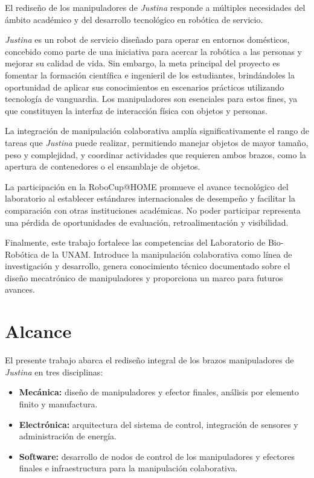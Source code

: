 El rediseño de los manipuladores de \emph{Justina} responde a múltiples necesidades del ámbito académico y del desarrollo tecnológico en robótica de servicio.

\emph{Justina} es un robot de servicio diseñado para operar en entornos domésticos, concebido como parte de una iniciativa para acercar la robótica a las personas y mejorar su calidad de vida. Sin embargo, la meta principal del proyecto es fomentar la formación científica e ingenieril de los estudiantes, brindándoles la oportunidad de aplicar sus conocimientos en escenarios prácticos utilizando tecnología de vanguardia\cite{BioRoboticsUNAM}. Los manipuladores son esenciales para estos fines, ya que constituyen la interfaz de interacción física con objetos y personas.  

La integración de manipulación colaborativa amplía significativamente el rango de tareas que \emph{Justina} puede realizar, permitiendo manejar objetos de mayor tamaño, peso y complejidad, y coordinar actividades que requieren ambos brazos, como la apertura de contenedores o el ensamblaje de objetos.

La participación en la RoboCup@HOME promueve el avance tecnológico del laboratorio al establecer estándares internacionales de desempeño y facilitar la comparación con otras instituciones académicas. No poder participar representa una pérdida de oportunidades de evaluación, retroalimentación y visibilidad.

Finalmente, este trabajo fortalece las competencias del Laboratorio de Bio-Robótica de la UNAM. Introduce la manipulación colaborativa como línea de investigación y desarrollo, genera conocimiento técnico documentado sobre el diseño mecatrónico de manipuladores y proporciona un marco para futuros avances.

\section{Alcance}

El presente trabajo abarca el rediseño integral de los brazos manipuladores de \emph{Justina} en tres disciplinas:

\begin{itemize}
    \item \textbf{Mecánica:} diseño de manipuladores y efector finales, análisis por elemento finito y manufactura.
    \item \textbf{Electrónica:} arquitectura del sistema de control, integración de sensores y administración de energía.
    \item \textbf{Software:} desarrollo de nodos de control de los manipuladores y efectores finales e infraestructura para la manipulación colaborativa.
\end{itemize}

